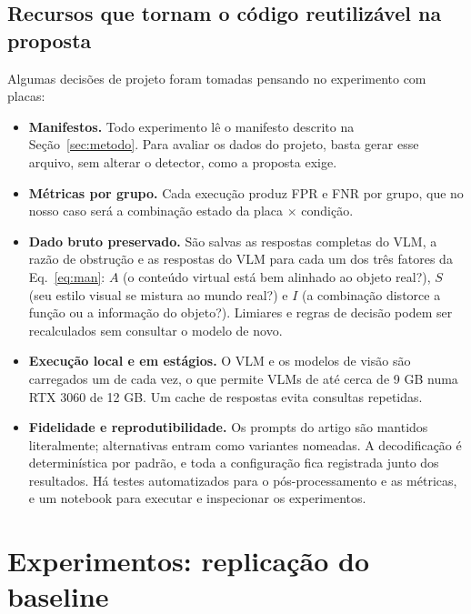 \documentclass[journal,onecolumn]{IEEEtran}
\begin{document}
\subsection{Recursos que tornam o código reutilizável na proposta}
Algumas decisões de projeto foram tomadas pensando no experimento com placas:
\begin{itemize}
\item \textbf{Manifestos.} Todo experimento lê o manifesto descrito na Seção~\ref{sec:metodo}. Para
  avaliar os dados do projeto, basta gerar esse arquivo, sem alterar o detector, como a proposta
  exige.
\item \textbf{Métricas por grupo.} Cada execução produz FPR e FNR por grupo, que no nosso caso será a
  combinação estado da placa $\times$ condição.
\item \textbf{Dado bruto preservado.} São salvas as respostas completas do VLM, a razão de obstrução
  e as respostas do VLM para cada um dos três fatores da Eq.~\eqref{eq:man}: $A$ (o conteúdo virtual
  está bem alinhado ao objeto real?), $S$ (seu estilo visual se mistura ao mundo real?) e $I$ (a
  combinação distorce a função ou a informação do objeto?). Limiares e regras de decisão podem ser
  recalculados sem consultar o modelo de novo.
\item \textbf{Execução local e em estágios.} O VLM e os modelos de visão são carregados um de cada
  vez, o que permite VLMs de até cerca de 9 GB numa RTX 3060 de 12 GB. Um cache de respostas evita
  consultas repetidas.
\item \textbf{Fidelidade e reprodutibilidade.} Os prompts do artigo são mantidos literalmente;
  alternativas entram como variantes nomeadas. A decodificação é determinística por padrão, e toda a
  configuração fica registrada junto dos resultados. Há testes automatizados para o pós-processamento
  e as métricas, e um notebook para executar e inspecionar os experimentos.
\end{itemize}

\section{Experimentos: replicação do baseline}
\label{sec:exp}
\end{document}
